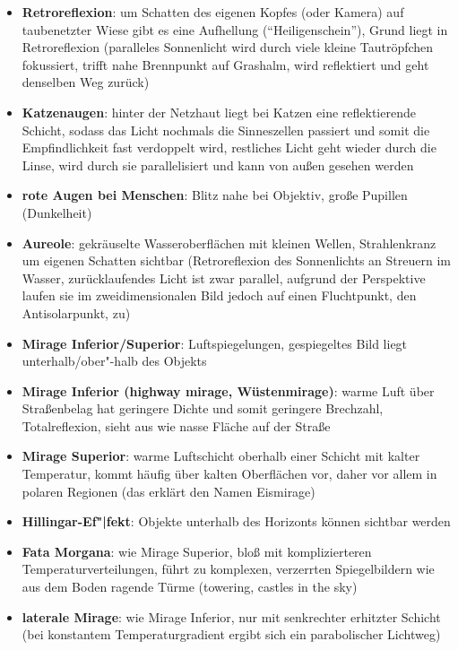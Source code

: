 \begin{itemize}
    \item
    \textbf{Retroreflexion}:
    um Schatten des eigenen Kopfes (oder Kamera) auf taubenetzter Wiese
    gibt es eine Aufhellung ("`Heiligenschein"'),
    Grund liegt in Retroreflexion (paralleles Sonnenlicht wird durch viele
    kleine Tautröpfchen fokussiert, trifft nahe Brennpunkt auf Grashalm, wird
    reflektiert und geht denselben Weg zurück)

    \item
    \textbf{Katzenaugen}:
    hinter der Netzhaut liegt bei Katzen eine reflektierende Schicht, sodass
    das Licht nochmals die Sinneszellen passiert und somit die Empfindlichkeit
    fast verdoppelt wird, restliches Licht geht wieder durch die Linse,
    wird durch sie parallelisiert und kann von außen gesehen werden

    \item
    \textbf{rote Augen bei Menschen}:
    Blitz nahe bei Objektiv, große Pupillen (Dunkelheit)

    \item
    \textbf{Aureole}:
    gekräuselte Wasseroberflächen mit kleinen Wellen, Strahlenkranz um eigenen
    Schatten sichtbar (Retroreflexion des Sonnenlichts an Streuern im Wasser,
    zurücklaufendes Licht ist zwar parallel, aufgrund der Perspektive laufen
    sie im zweidimensionalen Bild jedoch auf einen Fluchtpunkt, den
    Antisolarpunkt, zu)
\end{itemize}
\linie
\begin{itemize}
    \item
    \textbf{Mirage Inferior/Superior}:
    Luftspiegelungen,
    gespiegeltes Bild liegt unterhalb/ober"-halb des Objekts

    \item
    \textbf{Mirage Inferior (highway mirage, Wüstenmirage)}:
    warme Luft über Straßenbelag hat geringere Dichte und somit geringere
    Brechzahl, Totalreflexion, sieht aus wie nasse Fläche auf der Straße

    \item
    \textbf{Mirage Superior}:
    warme Luftschicht oberhalb einer Schicht mit kalter Temperatur,
    kommt häufig über kalten Oberflächen vor, daher vor allem in polaren
    Regionen (das erklärt den Namen Eismirage)

    \item
    \textbf{Hillingar-Ef"|fekt}:
    Objekte unterhalb des Horizonts können sichtbar werden

    \item
    \textbf{Fata Morgana}:
    wie Mirage Superior, bloß mit komplizierteren Temperaturverteilungen,
    führt zu komplexen, verzerrten Spiegelbildern wie aus dem Boden ragende
    Türme (towering, castles in the sky)

    \item
    \textbf{laterale Mirage}:
    wie Mirage Inferior, nur mit senkrechter erhitzter Schicht
    (bei konstantem Temperaturgradient ergibt sich ein parabolischer Lichtweg)
\end{itemize}
